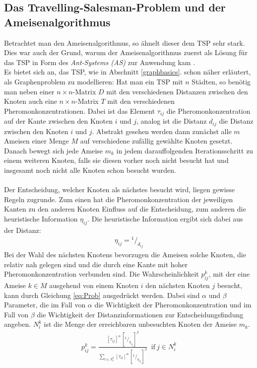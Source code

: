 \documentclass[doktyp=barbeit, sprache=german]{TUBAFarbeiten}
\newcommand*\rfrac[2]{{}^{#1}\!/_{#2}}
\begin{document}
\subsection{Das Travelling-Salesman-Problem und der Ameisenalgorithmus}
Betrachtet man den Ameisenalgorithmus, so ähnelt dieser dem TSP sehr stark. Dies war auch der Grund, warum der Ameisenalgorithmus zuerst als Lösung für das TSP \textendash{} in Form des \textit{Ant-Systems (AS)} \textendash{} zur Anwendung kam \cite{MaxMin}.
\\Es bietet sich an, das TSP, wie in Abschnitt \ref{graphbasics}. schon näher erläutert, als Graphenproblem zu modellieren:
Hat man ein TSP mit $n$ Städten, so benötig man neben einer $n\times n$-Matrix $D$ mit den verschiedenen Distanzen zwischen den Knoten auch eine $n\times n$-Matrix $T$ mit den verschiedenen Pheromonkonzentrationen. Dabei ist das Element $\tau_{ij}$ die Pheromonkonzentration auf der Kante zwischen den Knoten $i$ und $j$, analog ist die Distanz $d_{ij}$ die Distanz zwischen den Knoten $i$ und $j$. 
Abstrakt gesehen werden dann zunächst alle $m$ Ameisen einer Menge $M$ auf verschiedene zufällig gewählte Knoten gesetzt. Danach bewegt sich jede Ameise $m_k$ in jedem darauffolgenden Iterationsschritt zu einem weiteren Knoten, falls sie diesen vorher noch nicht besucht hat und insgesamt noch nicht alle Knoten schon besucht wurden. 
\\\\Der Entscheidung, welcher Knoten als nächstes besucht wird, liegen gewisse Regeln zugrunde. Zum einen hat die Pheromonkonzentration der jeweiligen Kanten zu den anderen Knoten Einfluss auf die Entscheidung, zum anderen die heuristische Information $\eta_{ij}$. Die heuristische Information ergibt sich dabei aus der Distanz:
\begin{align}
\label{eq:Heuristic}
\eta_{ij} = \rfrac{1}{d_{ij}}
\end{align}
Bei der Wahl des nächsten Knotens bevorzugen die Ameisen solche Knoten, die relativ nah gelegen sind und die durch eine Kante mit hoher Pheromonkonzentration verbunden sind.
Die Wahrscheinlichkeit $p^k_{ij}$, mit der eine Ameise $k \in M$ ausgehend von einem Knoten $i$ den nächsten Knoten $j$ besucht, kann durch Gleichung \ref{eq:Prob} ausgedrückt werden.
Dabei sind $\alpha$ und $\beta$ Parameter, die im Fall von $\alpha$ die Wichtigkeit der Pheromonkonzentration und im Fall von $\beta$ die Wichtigkeit der Distanzinformationen zur Entscheidungsfindung angeben. $N^k_i$ ist die Menge der erreichbaren unbesuchten Knoten der Ameise $m_k$.
\begin{align}
\label{eq:Prob}
p^k_{ij} = \frac{[\tau_{ij}]^\alpha \, [\rfrac{1}{\eta_{ij}}]^\beta}{\sum\nolimits_{l\in N^k_i} [\tau_{il}]^\alpha \, [\rfrac{1}{\eta_{ij}}]^\beta} \; \; \text{if}\: j \in N^k_i    
\end{align}
\end{document}
